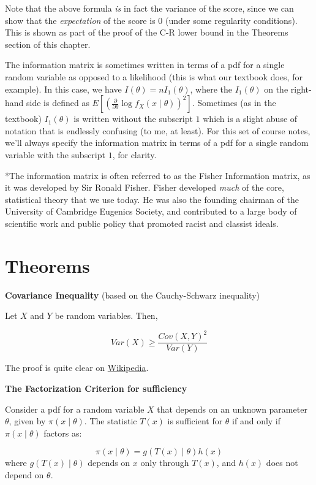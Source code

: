 \documentclass[
  letterpaper,
  DIV=11,
  numbers=noendperiod]{scrreprt}
\begin{document}
Note that the above formula \emph{is} in fact the variance of the score,
since we can show that the \emph{expectation} of the score is 0 (under
some regularity conditions). This is shown as part of the proof of the
C-R lower bound in the Theorems section of this chapter.

The information matrix is sometimes written in terms of a pdf for a
single random variable as opposed to a likelihood (this is what our
textbook does, for example). In this case, we have
\(I(\theta) = n I_1(\theta)\), where the \(I_1(\theta)\) on the
right-hand side is defined as
\(E \left[ \left( \frac{\partial}{\partial \theta} \log f_X(x \mid \theta) \right)^2\right]\).
Sometimes (as in the textbook) \(I_1(\theta)\) is written without the
subscript \(1\) which is a slight abuse of notation that is endlessly
confusing (to me, at least). For this set of course notes, we'll always
specify the information matrix in terms of a pdf for a single random
variable with the subscript \(1\), for clarity.

*The information matrix is often referred to as the Fisher Information
matrix, as it was developed by Sir Ronald Fisher. Fisher developed
\emph{much} of the core, statistical theory that we use today. He was
also the founding chairman of the University of Cambridge Eugenics
Society, and contributed to a large body of scientific work and public
policy that promoted racist and classist ideals.

\section{Theorems}\label{theorems-3}

\textbf{Covariance Inequality} (based on the Cauchy-Schwarz inequality)

Let \(X\) and \(Y\) be random variables. Then,

\[
Var(X) \geq \frac{Cov(X, Y)^2}{Var(Y)}
\]

The proof is quite clear on
\href{https://en.wikipedia.org/wiki/Cauchy\%E2\%80\%93Schwarz_inequality}{Wikipedia}.

\textbf{The Factorization Criterion for sufficiency}

Consider a pdf for a random variable \(X\) that depends on an unknown
parameter \(\theta\), given by \(\pi(x \mid \theta)\). The statistic
\(T(x)\) is sufficient for \(\theta\) if and only if
\(\pi(x \mid \theta)\) factors as:

\[
\pi(x \mid \theta) = g(T(x) \mid \theta) h(x)
\] where \(g(T(x) \mid \theta)\) depends on \(x\) only through \(T(x)\),
and \(h(x)\) does not depend on \(\theta\).
\end{document}
